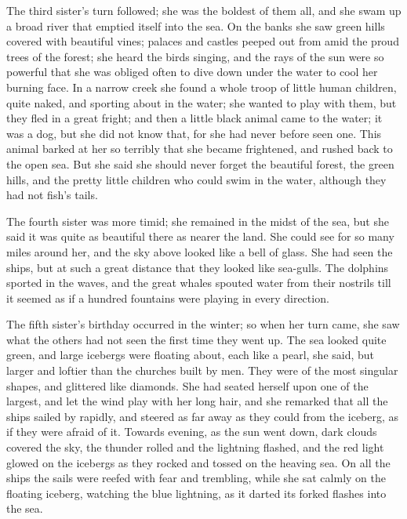 The third sister's turn followed; she was the boldest of them all,
and she swam up a broad river that emptied itself into the sea. 
On the
banks she saw green hills covered with beautiful vines; palaces and
castles peeped out from amid the proud trees of the forest; she
heard the birds singing, and the rays of the sun were so powerful that
she was obliged often to dive down under the water to cool her burning
face. 
In a narrow creek she found a whole troop of little human
children, quite naked, and sporting about in the water; she wanted
to play with them, but they fled in a great fright; and then a
little black animal came to the water; it was a dog, but she did not
know that, for she had never before seen one. 
This animal barked at
her so terribly that she became frightened, and rushed back to the
open sea. 
But she said she should never forget the beautiful forest,
the green hills, and the pretty little children who could swim in
the water, although they had not fish's tails.

The fourth sister was more timid; she remained in the midst of the
sea, but she said it was quite as beautiful there as nearer the
land. 
She could see for so many miles around her, and the sky above
looked like a bell of glass. 
She had seen the ships, but at such a
great distance that they looked like sea-gulls. 
The dolphins sported
in the waves, and the great whales spouted water from their nostrils
till it seemed as if a hundred fountains were playing in every
direction.

The fifth sister's birthday occurred in the winter; so when her
turn came, she saw what the others had not seen the first time they
went up. 
The sea looked quite green, and large icebergs were
floating about, each like a pearl, she said, but larger and loftier
than the churches built by men. 
They were of the most singular shapes,
and glittered like diamonds. 
She had seated herself upon one of the
largest, and let the wind play with her long hair, and she remarked
that all the ships sailed by rapidly, and steered as far away as
they could from the iceberg, as if they were afraid of it. 
Towards
evening, as the sun went down, dark clouds covered the sky, the
thunder rolled and the lightning flashed, and the red light glowed
on the icebergs as they rocked and tossed on the heaving sea. 
On all
the ships the sails were reefed with fear and trembling, while she sat
calmly on the floating iceberg, watching the blue lightning, as it
darted its forked flashes into the sea.

